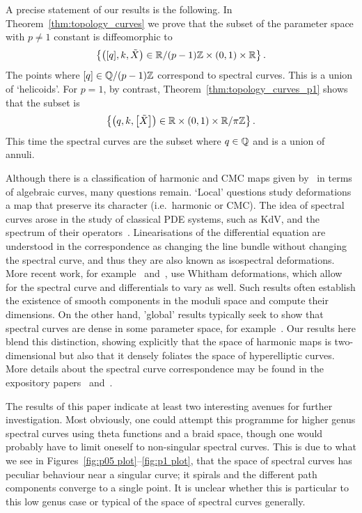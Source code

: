 \documentclass{article}
\begin{document}
A precise statement of our results is the following. In Theorem~\ref{thm:topology_curves} we prove that the subset of the parameter space with $p\neq 1$ constant is diffeomorphic to 
\[
\left\{ \left([q],k,\tilde{X}\right) \in \mathbb{R}/(p-1)\mathbb{Z} \times (0,1) \times \mathbb{R} \right\}.
\]
The points where $[q] \in \mathbb{Q}/(p-1)\mathbb{Z}$ correspond to spectral curves. This is a union of `helicoids'.
For $p=1$, by contrast, Theorem~\ref{thm:topology_curves_p1} shows that the subset is 
\[
\left\{ \left(q,k,\left[\tilde{X}\right]\right) \in \mathbb{R} \times (0,1) \times \mathbb{R}/\pi\mathbb{Z} \right\}.
\]
This time the spectral curves are the subset where $q\in\mathbb{Q}$ and is a union of annuli.






Although there is a classification of harmonic and CMC maps given by~\cite{Hitchin1990,Pinkall1989,Bobenko1991} in terms of algebraic curves, many questions remain. 
`Local' questions study deformations a map that preserve its character (i.e.~harmonic or CMC). The idea of spectral curves arose in the study of classical PDE systems, such as KdV, and the spectrum of their operators~\cite{Flaschka1980,Krichever1995}. Linearisations of the differential equation are understood in the correspondence as changing the line bundle without changing the spectral curve, and thus they are also known as isospectral deformations. More recent work, for example~\cite{Kilian2010} and~\cite{Carberry2019}, use Whitham deformations, which allow for the spectral curve and differentials to vary as well. Such results often establish the existence of smooth components in the moduli space and compute their dimensions.
On the other hand, 'global' results typically seek to show that spectral curves are dense in some parameter space, for example~\cite{Carberry2016a,Carberry2016}.
Our results here blend this distinction, showing explicitly that the space of harmonic maps is two-dimensional but also that it densely foliates the space of hyperelliptic curves.
More details about the spectral curve correspondence may be found in the expository papers~\cite{McIntosh2008} and~\cite{Carberry2013a}.

The results of this paper indicate at least two interesting avenues for further investigation. Most obviously, one could attempt this programme for higher genus spectral curves using theta functions and a braid space, though one would probably have to limit oneself to non-singular spectral curves. This is due to what we see in Figures~\ref{fig:p05 plot}--\ref{fig:p1 plot}, that the space of spectral curves has peculiar behaviour near a singular curve; it spirals and the different path components converge to a single point. It is unclear whether this is particular to this low genus case or typical of the space of spectral curves generally.
\end{document}
